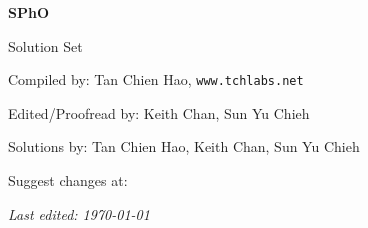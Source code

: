 \setcounter{section}{0}
\setcounter{solcounter}{0}

 


\begin{titlepage}
\centering

{\Huge\bfseries SPhO \sphoyear}

\vspace{1cm}

{\LARGE Solution Set}

\vspace{2cm}

{\Large Compiled by: Tan Chien Hao, \texttt{www.tchlabs.net}}

\vspace{2cm}

{\Large Edited/Proofread by: Keith Chan, Sun Yu Chieh}

\vspace{2cm}

{\Large Solutions by: Tan Chien Hao, Keith Chan, Sun Yu Chieh}

\vspace{2cm}

{\large Suggest changes at: \github}


\vfill

{\itshape Last edited: \today}
\end{titlepage}



